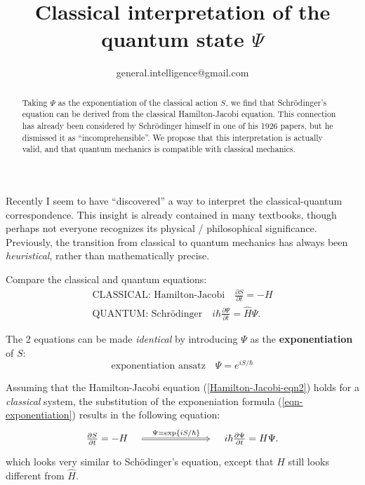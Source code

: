 

\title{Classical interpretation of the quantum state $\Psi$}
\author{ {\footnotesize general.intelligence@gmail.com}}



	\setlength{\parindent}{0pt}
	\setlength{\parskip}{2.8ex plus0.8ex minus0.8ex}
	
	\maketitle
	
\begin{abstract}
	Taking $\Psi$ as the exponentiation of the classical action $S$, we find that Schr\"odinger's equation can be derived from the classical Hamilton-Jacobi equation.  This connection has already been considered by Schr\"odinger himself in one of his 1926 papers, but he dismissed it as ``incomprehensible''.  We propose that this interpretation is actually valid, and that quantum mechanics is compatible with classical mechanics.
\end{abstract}

Recently I seem to have ``discovered'' a way to interpret the classical-quantum correspondence.  This insight is already contained in many textbooks, though perhaps not everyone recognizes its physical / philosophical significance.  Previously, the transition from classical to quantum mechanics has always been \textit{heuristical}, rather than mathematically precise.

Compare the classical and quantum equations:
\begin{eqnarray}
\boxed{\mbox{CLASSICAL: Hamilton-Jacobi}} \quad
\frac{\partial S}{\partial t} = - H
\label{Hamilton-Jacobi-eqn2}
\\
\boxed{\mbox{QUANTUM: Schr\"{o}dinger}} \quad
i \hbar \frac{\partial \Psi}{\partial t} = \hat{H} \Psi .
\label{Schrodinger-eqn}
\end{eqnarray}

The 2 equations can be made \textit{identical} by introducing $\Psi$ as the \textbf{exponentiation} of $S$:
\begin{equation}
\boxed{\mbox{exponentiation ansatz}} \quad
\Psi = e^{i S /\hbar}
\label{eqn-exponentiation}
\end{equation}

Assuming that the Hamilton-Jacobi equation (\ref{Hamilton-Jacobi-eqn2}) holds for a \textit{classical} system, the substitution of the exponeniation formula (\ref{eqn-exponentiation}) results in the following equation:
\begin{equation}
\begin{tikzcd}[column sep = 7em]
\frac{\partial S}{\partial t} = - H \quad
\arrow[Rightarrow, r, "$\Psi = \exp \{ i S / \hbar \} $", align=center]
& \quad i \hbar \frac{\partial \Psi}{\partial t} = H \Psi .
\end{tikzcd}
\end{equation} 
which looks very similar to Sch\"odinger's equation, except that $H$ still looks different from $\hat{H}$.

